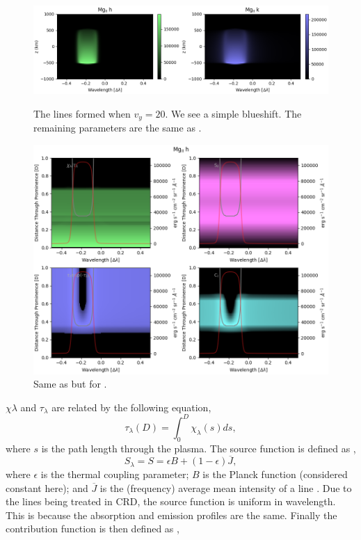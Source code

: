 \begin{figure}
    \centering
    \includegraphics[width=\linewidth]{./03Modelling2D/figs/matplots/mgvy20cont.png}
    \caption{The \mgiihk{} lines formed when $v_y=20$\kms. We see a simple blueshift. The remaining parameters are the same as .}
    \label{v20} \vspace{20pt}
    \includegraphics[width=\linewidth]{./03Modelling2D/figs/matplots/mghvy20.png}
    \caption{Same as  but for .}
    \label{vh20}
\end{figure}
\newpage
$\chi\lambda$ and $\tau_\lambda$ are related by the following equation,
\begin{equation}
    \tau_\lambda(D)=\int_0^D\chi_\lambda(s)ds,
\end{equation}
where $s$ is the path length through the plasma. The source function is defined as \citep{gouttebroze_radiative_2004},
\begin{equation}
    S_\lambda=S=\epsilon B+(1-\epsilon)\overline{J},
\end{equation}
where $\epsilon$ is the thermal coupling parameter; $B$ is the Planck function (considered constant here); and $\overline{J}$ is the (frequency) average mean intensity of a line \citep{hubeny_theory_2015}. Due to the lines being treated in CRD, the source function is uniform in wavelength. This is because the absorption and emission profiles are the same. Finally the contribution function is then defined as \citep{carlsson_formation_1997},
